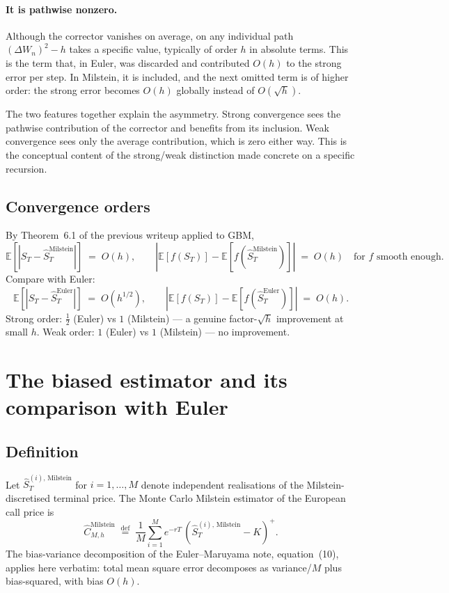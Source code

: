 \documentclass[11pt,a4paper]{article}
\theoremstyle{plain}
\theoremstyle{definition}
\theoremstyle{remark}
\newcommand{\E}{\mathbb{E}}
\newcommand{\eqdef}{\overset{\mathrm{def}}{=}}
\begin{document}
\paragraph{It is pathwise nonzero.} Although the corrector vanishes
on average, on any individual path $(\Delta W_n)^2 - h$ takes a
specific value, typically of order $h$ in absolute terms. This is
the term that, in Euler, was discarded and contributed $O(h)$ to the
strong error per step. In Milstein, it is included, and the next
omitted term is of higher order: the strong error becomes $O(h)$
globally instead of $O(\sqrt{h})$.

The two features together explain the asymmetry. Strong convergence
sees the pathwise contribution of the corrector and benefits from
its inclusion. Weak convergence sees only the average contribution,
which is zero either way. This is the conceptual content of the
strong/weak distinction made concrete on a specific recursion.

\subsection{Convergence orders}

By Theorem~6.1 of the previous writeup applied to GBM,
\begin{equation}
\label{eq:milstein-orders}
\E[|S_T - \hat S_T^{\mathrm{Milstein}}|] \;=\; O(h),
\qquad
|\E[f(S_T)] - \E[f(\hat S_T^{\mathrm{Milstein}})]| \;=\; O(h)
\quad \text{for } f \text{ smooth enough}.
\end{equation}
Compare with Euler:
\begin{equation}
\E[|S_T - \hat S_T^{\mathrm{Euler}}|] \;=\; O(h^{1/2}),
\qquad
|\E[f(S_T)] - \E[f(\hat S_T^{\mathrm{Euler}})]| \;=\; O(h).
\end{equation}
Strong order: $\tfrac{1}{2}$ (Euler) vs $1$ (Milstein) --- a genuine
factor-$\sqrt{h}$ improvement at small $h$. Weak order: $1$ (Euler)
vs $1$ (Milstein) --- no improvement.

\section{The biased estimator and its comparison with Euler}
\label{sec:estimator}

\subsection{Definition}

Let $\hat S_T^{(i), \,\mathrm{Milstein}}$ for $i = 1, \ldots, M$ denote
independent realisations of the Milstein-discretised terminal price.
The Monte Carlo Milstein estimator of the European call price is
\begin{equation}
\hat C_{M, h}^{\mathrm{Milstein}} \;\eqdef\; \frac{1}{M} \sum_{i=1}^{M}
e^{-rT}\, (\hat S_T^{(i), \,\mathrm{Milstein}} - K)^+.
\end{equation}
The bias-variance decomposition of the Euler--Maruyama note,
equation~(10), applies
here verbatim: total mean square error decomposes as variance/$M$
plus bias-squared, with bias $O(h)$.
\end{document}

